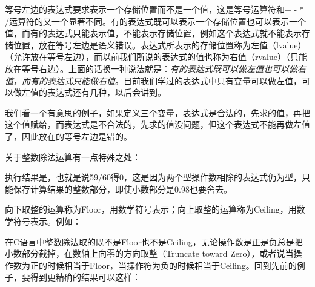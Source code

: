 

等号左边的表达式要求表示一个存储位置而不是一个值，这是等号运算符和+ - * /运算符的又一个显著不同。有的表达式既可以表示一个存储位置也可以表示一个值，而有的表达式只能表示值，不能表示存储位置，例如这个表达式就不能表示存储位置，放在等号左边是语义错误。表达式所表示的存储位置称为左值（lvalue）（允许放在等号左边），而以前我们所说的表达式的值也称为右值（rvalue）（只能放在等号右边）。上面的话换一种说法就是：\emph{有的表达式既可以做左值也可以做右值，而有的表达式只能做右值}。目前我们学过的表达式中只有变量可以做左值，可以做左值的表达式还有几种，以后会讲到。



我们看一个有意思的例子，如果定义三个变量，表达式是合法的，先求的值，再把这个值赋给，而表达式是不合法的，先求的值没问题，但这个表达式不能再做左值了，因此放在的等号左边是错的。



关于整数除法运算有一点特殊之处：




执行结果是，也就是说59/\BookSplit{}60得0，这是因为两个型操作数相除的表达式仍为型，只能保存计算结果的整数部分，即使小数部分是0.\BookSplit{}98也要舍去。



向下取整的运算称为Floor，用数学符号表示；向上取整的运算称为Ceiling，用数学符号表示。例如：



在C语言中整数除法取的既不是Floor也不是Ceiling，无论操作数是正是负总是把小数部分截掉，在数轴上向零的方向取整（Truncate toward Zero），或者说当操作数为正的时候相当于Floor，当操作符为负的时候相当于Ceiling。回到先前的例子，要得到更精确的结果可以这样：



